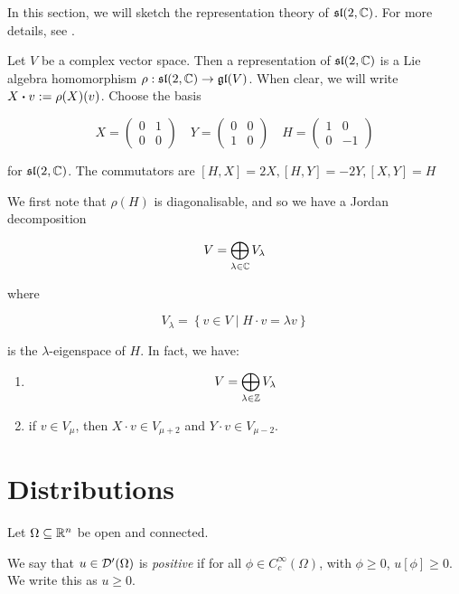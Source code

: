 \documentclass{article}
\renewcommand{\sl}{\mathfrak{sl}}
\begin{document}
In this section, we will sketch the representation theory of \(\sl(2, \C)\). For more details, see \cite[Section 7]{humphreys}.

Let \(V\) be a complex vector space. Then a representation of \(\sl(2, \C)\) is a Lie algebra homomorphism \(\rho : \sl(2, \C) \to \gl(V)\). When clear, we will write \(X \vdot v := \rho(X)(v)\). Choose the basis

\[X = \begin{pmatrix}
    0 & 1 \\
    0 & 0
\end{pmatrix} \quad Y = \begin{pmatrix}
    0 & 0 \\
    1 & 0
\end{pmatrix} \quad H = \begin{pmatrix}
    1 & 0 \\
    0 & -1
\end{pmatrix}\]

for \(\sl(2, \C)\). The commutators are \([H, X] = 2X, [H, Y] = -2Y, [X,Y] = H\)

We first note that \(\rho(H)\) is diagonalisable, and so we have a Jordan decomposition

\[V = \bigoplus_{\lambda \in \mathbb{C}}V_\lambda\]

where

\[V_\lambda = \left\{v \in V \mid H \cdot v = \lambda v\right\}\]

is the \(\lambda\)-eigenspace of \(H\). In fact, we have:

\begin{enumerate}
    \item \[V = \bigoplus_{\lambda \in \mathbb{Z}}V_\lambda\]
    \item if \(v \in V_\mu\), then \(X \cdot v \in V_{\mu+2}\) and \(Y \cdot v \in V_{\mu-2}\).
\end{enumerate}

\section{Distributions}

\label{sec:distributions}

Let \(\Omega \subseteq \mathbb{R}^n\) be open and connected.

\begin{definition}
    [positive]
    We say that \(u \in \mathcal{D}'(\Omega)\) is \emph{positive} if for all \(\phi \in C_c^\infty(\Omega)\), with \(\phi \ge 0\), \(u[\phi] \ge 0\). We write this as \(u \ge 0\). 
\end{definition}
\end{document}
